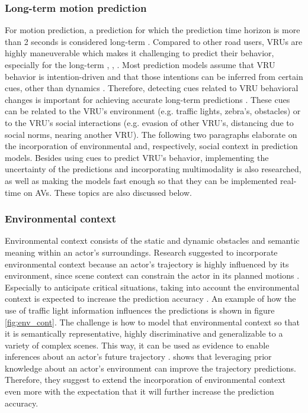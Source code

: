 \subsubsection{Long-term motion prediction}
For motion prediction, a prediction for which the prediction time horizon is more than 2 seconds is considered long-term \cite{hormann2020long}. Compared to other road users, \glspl{VRU} are highly maneuverable which makes it challenging to predict their behavior, especially for the long-term \cite{xiong2019recurrent}, \cite{rehder2018pedestrian}, \cite{rehder2018pedestrian}. Most prediction models assume that \gls{VRU} behavior is intention-driven and that those intentions can be inferred from certain cues, other than dynamics \cite{rehder2018pedestrian}. Therefore, detecting cues related to \gls{VRU} behavioral changes is important for achieving accurate long-term predictions \cite{pool2017using}. These cues can be related to the \gls{VRU}'s environment (e.g. traffic lights, zebra's, obstacles) or to the \gls{VRU}'s social interactions (e.g. evasion of other \gls{VRU}'s, distancing due to social norms, nearing another \gls{VRU}). The following two paragraphs elaborate on the incorporation of environmental and, respectively, social context in prediction models. Besides using cues to predict \gls{VRU}'s behavior, implementing the uncertainty of the predictions and incorporating multimodality is also researched, as well as making the models fast enough so that they can be implemented real-time on \glspl{AV}. These topics are also discussed below. 

\subsubsection{Environmental context}

Environmental context consists of the static and dynamic obstacles and semantic meaning within an actor's surroundings. Research suggested to incorporate environmental context because an actor's trajectory is highly influenced by its environment, since scene context can constrain the actor in its planned motions \cite{chou2020predicting} \cite{pfeiffer2018data} \cite{sadeghian2019sophie} \cite{manh2018scene}. Especially to anticipate critical situations, taking into account the environmental context is expected to increase the prediction accuracy \cite{uah2020d4}. An example of how the use of traffic light information influences the predictions is shown in figure \ref{fig:env_cont}. The challenge is how to model that environmental context so that it is semantically representative, highly discriminative and generalizable to a variety of complex scenes. This way, it can be used as evidence to enable inferences about an actor's future trajectory \cite{varshneya2017human}. \cite{pool2017using} shows that leveraging prior knowledge about an actor's environment can improve the trajectory predictions. Therefore, they suggest to extend the incorporation of environmental context even more with the expectation that it will further increase the prediction accuracy.  

